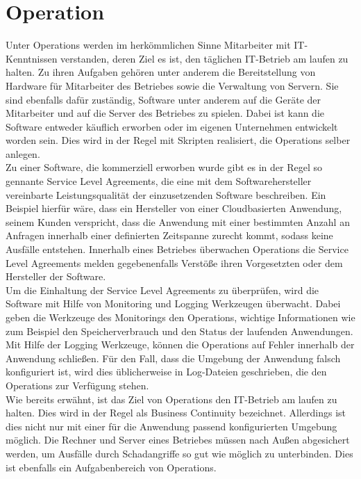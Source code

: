\section{Operation}
Unter Operations werden im herkömmlichen Sinne Mitarbeiter mit IT-Kenntnissen verstanden, deren Ziel es ist, den täglichen IT-Betrieb am laufen zu halten. Zu ihren Aufgaben gehören unter anderem die Bereitstellung von Hardware für Mitarbeiter des Betriebes sowie die Verwaltung von Servern. Sie sind ebenfalls dafür zuständig, Software unter anderem auf die Geräte der Mitarbeiter und auf die Server des Betriebes zu spielen. Dabei ist kann die Software entweder käuflich erworben oder im eigenen Unternehmen entwickelt worden sein. Dies wird in der Regel mit Skripten realisiert, die Operations selber anlegen.\\
Zu einer Software, die kommerziell erworben wurde gibt es in der Regel so gennante Service Level Agreements, die eine mit dem Softwarehersteller vereinbarte Leistungsqualität der einzusetzenden Software beschreiben. Ein Beispiel hierfür wäre, dass ein Hersteller von einer Cloudbasierten Anwendung, seinem Kunden verspricht, dass die Anwendung mit einer bestimmten Anzahl an Anfragen innerhalb einer definierten Zeitspanne zurecht kommt, sodass keine Ausfälle entstehen. Innerhalb eines Betriebes überwachen Operations die Service Level Agreements melden gegebenenfalls Verstöße ihren Vorgesetzten oder dem Hersteller der Software. \\
Um die Einhaltung der Service Level Agreements zu überprüfen, wird die Software mit Hilfe von Monitoring und Logging Werkzeugen überwacht. Dabei geben die Werkzeuge des Monitorings den Operations, wichtige Informationen wie zum Beispiel den Speicherverbrauch und den Status der laufenden Anwendungen. Mit Hilfe der Logging Werkzeuge, können die Operations auf Fehler innerhalb der Anwendung schließen. Für den Fall, dass die Umgebung der Anwendung falsch konfiguriert ist, wird dies üblicherweise in Log-Dateien geschrieben, die den Operations zur Verfügung stehen. \\
Wie bereits erwähnt, ist das Ziel von Operations den IT-Betrieb am laufen zu halten. Dies wird in der Regel als Business Continuity bezeichnet. Allerdings ist dies nicht nur mit einer für die Anwendung passend konfigurierten Umgebung möglich. Die Rechner und Server eines Betriebes müssen nach Außen abgesichert werden, um Ausfälle durch Schadangriffe so gut wie möglich zu unterbinden. Dies ist ebenfalls ein Aufgabenbereich von Operations.

